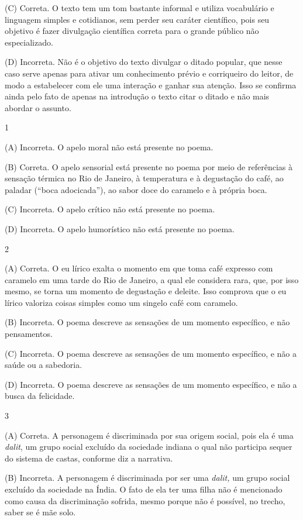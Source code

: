 (C) Correta. O texto tem um tom bastante informal e utiliza vocabulário
e linguagem simples e cotidianos, sem perder seu caráter científico,
pois seu objetivo é fazer divulgação científica correta para o grande
público não especializado.

(D) Incorreta. Não é o objetivo do texto divulgar o ditado popular, que
nesse caso serve apenas para ativar um conhecimento prévio e corriqueiro
do leitor, de modo a estabelecer com ele uma interação e ganhar sua
atenção. Isso se confirma ainda pelo fato de apenas na introdução o
texto citar o ditado e não mais abordar o assunto.


\num{1}

(A) Incorreta. O apelo moral não está presente no poema.

(B) Correta. O apelo sensorial está presente no poema por meio de
referências à sensação térmica no Rio de Janeiro, à temperatura e à
degustação do café, ao paladar (``boca adocicada''), ao sabor doce do
caramelo e à própria boca.

(C) Incorreta. O apelo crítico não está presente no poema.

(D) Incorreta. O apelo humorístico não está presente no poema.

\num{2}

(A) Correta. O eu lírico exalta o momento em que toma café expresso com
caramelo em uma tarde do Rio de Janeiro, a qual ele considera rara, que,
por isso mesmo, se torna um momento de degustação e deleite. Isso
comprova que o eu lírico valoriza coisas simples como um singelo café
com caramelo.

(B) Incorreta. O poema descreve as sensações de um momento específico, e
não pensamentos.

(C) Incorreta. O poema descreve as sensações de um momento específico, e
não a saúde ou a sabedoria.

(D) Incorreta. O poema descreve as sensações de um momento específico, e
não a busca da felicidade.

\num{3}

(A) Correta. A personagem é discriminada por sua origem social, pois ela
é uma \emph{dalit}, um grupo social excluído da sociedade indiana o qual
não participa sequer do sistema de castas, conforme diz a narrativa.

(B) Incorreta. A personagem é discriminada por ser uma \emph{dalit,} um
grupo social excluído da sociedade na Índia. O fato de ela ter uma filha
não é mencionado como causa da discriminação sofrida, mesmo porque não é
possível, no trecho, saber se é mãe solo.

